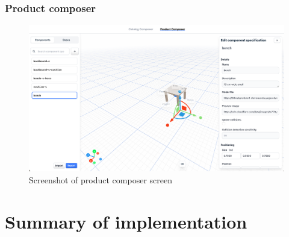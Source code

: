 \subsubsection{Product composer}

\begin{figure}[h]
\centering
\includegraphics[width=\textwidth]{images/screenshot_productcomposer.png}
\caption{Screenshot of product composer screen}
\label{fig:screenshot-produtcomposer}
\end{figure}

\section{Summary of implementation}